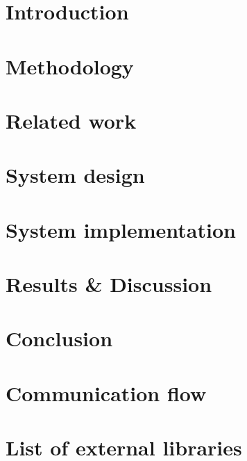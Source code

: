 \documentclass[Report.tex]{subfiles}
\begin{document}
\chapter{Introduction}\label{sec:intro}
  
\clearpage

\chapter{Methodology}\label{sec:methodology}
  
\clearpage

\chapter{Related work}\label{sec:similar}
  
\clearpage

\chapter{System design}\label{sec:system}
  
\clearpage

\chapter{System implementation}\label{sec:system}
  
\clearpage

\chapter{Results & Discussion}\label{sec:discussion}
  
\clearpage

\chapter{Conclusion}\label{sec:conclusion}
  
\clearpage

\nocite{*} %
\printbibliography%
\clearpage

\begin{appendices}
\chapter{Communication flow}
  
\clearpage
\chapter{List of external libraries}
  
\end{appendices}
\end{document}
